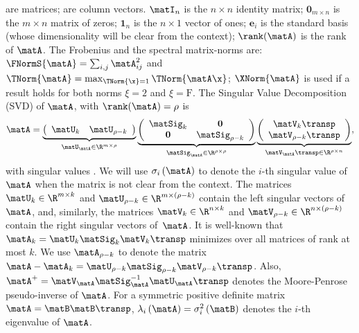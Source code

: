 \math{\matA,\matB,\ldots} are matrices; \math{\a,\b,\ldots} are
column vectors. $\matI_{n}$ is the $n \times n$
identity matrix;  $\bm{0}_{m \times n}$ is the $m \times n$ matrix of zeros; $\bm{1}_n$ is the $n \times 1$ vector of ones; $\bm{e}_i$ is the standard basis (whose dimensionality will be clear from the context); $\rank(\matA)$ is the rank of $\matA$.
The Frobenius and the spectral matrix-norms are:
$ \FNormS{\matA} = \sum_{i,j} \matA_{ij}^2$
and $\TNorm{\matA} = \max_{\TNorm{\x}=1}\TNorm{\matA\x}$;
 $\XNorm{\matA}$ is used if a result holds for
both norms $\xi = 2$ and $\xi = \mathrm{F}$.
The Singular Value Decomposition (SVD) of
$\matA$, with $\rank(\matA) = \rho$ is
\begin{eqnarray*}
\label{svdA} \matA
         = \underbrace{\left(\begin{array}{cc}
             \matU_{k} & \matU_{\rho-k}
          \end{array}
    \right)}_{\matU_{\matA} \in \R^{m \times \rho}}
    \underbrace{\left(\begin{array}{cc}
             \matSig_{k} & \bf{0}\\
             \bf{0} & \matSig_{\rho - k}
          \end{array}
    \right)}_{\matSig_\matA \in \R^{\rho \times \rho}}
    \underbrace{\left(\begin{array}{c}
             \matV_{k}\transp\\
             \matV_{\rho-k}\transp
          \end{array}
    \right)}_{\matV_\matA\transp \in \R^{\rho \times n}},
\end{eqnarray*}
with singular values .
We will use $\sigma_i\left(\matA\right)$ to denote the $i$-th
singular value of $\matA$ when the matrix is not clear from the context.
The matrices
$\matU_k \in \R^{m \times k}$ and $\matU_{\rho-k} \in \R^{m \times (\rho-k)}$ contain the left singular vectors of~$\matA$, and, similarly, the matrices $\matV_k \in \R^{n \times k}$ and $\matV_{\rho-k} \in \R^{n \times (\rho-k)}$ contain the right singular vectors of~$\matA$. It is well-known that $\matA_k=\matU_k \matSig_k \matV_k\transp$ minimizes \math{\XNorm{\matA - \matX}} over all
matrices  of rank at most $k$. We use $\matA_{\rho-k}$ to denote the matrix $\matA - \matA_k = \matU_{\rho-k}\matSig_{\rho-k}\matV_{\rho-k}\transp$. Also,
$\matA^+ = \matV_\matA \matSig_\matA^{-1} \matU_\matA\transp$ denotes the Moore-Penrose pseudo-inverse of $\matA$.
For a symmetric positive definite matrix $\matA=\matB\matB\transp$, $\lambda_{i}\left(\matA\right) = \sigma_{i}^2\left(\matB\right)$ denotes the $i$-th eigenvalue of $\matA$.

